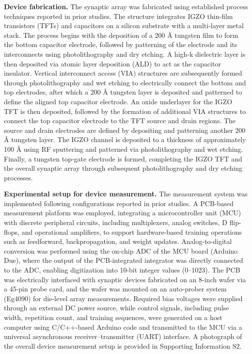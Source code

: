\documentclass[AMA,LATO2COL]{WileyNJDv5}
\begin{document}
\noindent\textbf{Device fabrication.}
The synaptic array was fabricated using established process techniques reported in prior studies\cite{won2023advs_6t1c, kang2025advs_disturbance}. The structure integrates IGZO thin-film transistors (TFTs) and capacitors on a silicon substrate with a multi-layer metal stack. The process begins with the deposition of a 200 Å tungsten film to form the bottom capacitor electrode, followed by patterning of the electrode and its interconnects using photolithography and dry etching. A high-k dielectric layer is then deposited via atomic layer deposition (ALD) to act as the capacitor insulator. Vertical interconnect access (VIA) structures are subsequently formed through photolithography and wet etching to electrically connect the bottom and top electrodes, after which a 200 Å tungsten layer is deposited and patterned to define the aligned top capacitor electrode. An oxide underlayer for the IGZO TFT is then deposited, followed by the formation of additional VIA structures to connect the top capacitor electrode to the TFT source and drain regions. The source and drain electrodes are defined by depositing and patterning another 200 Å tungsten layer. The IGZO channel is deposited to a thickness of approximately 100 Å using RF sputtering and patterned via photolithography and wet etching. Finally, a tungsten top-gate electrode is formed, completing the IGZO TFT and the overall synaptic array through subsequent photolithography and dry etching processes.

\noindent\textbf{Experimental setup for device measurement.}
The measurement system was implemented following configurations reported in prior studies\cite{won2023advs_6t1c, kang2025advs_disturbance}. A PCB-based measurement platform was employed, integrating a microcontroller unit (MCU) with discrete peripheral circuits, including multiplexers, analog switches, D flip-flops, and operational amplifiers, to support hardware-based training operations such as feedforward, backpropagation, and weight updates. Analog-to-digital conversion was performed using the on-chip ADC of the MCU board (Arduino Due), where the output of the PCB-integrated integrator was directly connected to the ADC, enabling digitization into 10-bit integer values (0–1023). The PCB was electrically interfaced with synaptic devices fabricated on an 8-inch wafer via a 45-pin probe card, and the wafer was mounted on an auto-prober system (Eg4090) for die-level array measurements. Required bias voltages were supplied through an external DC power source, while control signals, including pulse width, repetition count, and training sequences, were generated on a host computer using C/C++-based Arduino code and transmitted to the MCU via a universal asynchronous receiver–transmitter (UART) interface. A photograph of the overall device measurement setup is provided in Supporting Information S2.
\end{document}
